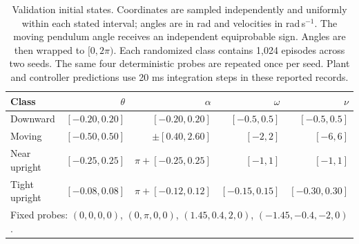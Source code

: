 \documentclass[letterpaper,10pt,conference]{ieeeconf}
\newcommand{\Estar}{E_{\star}}
\begin{document}

\begin{table}[t]
\centering\small
\caption{Validation initial states. Coordinates are sampled independently and uniformly within each stated interval; angles are in rad and velocities in rad\,s$^{-1}$. The moving pendulum angle receives an independent equiprobable sign. Angles are then wrapped to $[0,2\pi)$. Each randomized class contains 1,024 episodes across two seeds. The same four deterministic probes are repeated once per seed. Plant and controller predictions use 20 ms integration steps in these reported records.}
\label{tab:initial}
\begin{tabular}{lrrrr}
\toprule Class & $\theta$ & $\alpha$ & $\omega$ & $\nu$ \\
\midrule Downward & $[-0.20,0.20]$ & $[-0.20,0.20]$ & $[-0.5,0.5]$ & $[-0.5,0.5]$ \\
Moving & $[-0.50,0.50]$ & $\pm[0.40,2.60]$ & $[-2,2]$ & $[-6,6]$ \\
Near upright & $[-0.25,0.25]$ & $\pi+[-0.25,0.25]$ & $[-1,1]$ & $[-1,1]$ \\
Tight upright & $[-0.08,0.08]$ & $\pi+[-0.12,0.12]$ & $[-0.15,0.15]$ & $[-0.30,0.30]$ \\
\midrule
\multicolumn{5}{l}{Fixed probes: $(0,0,0,0)$, $(0,\pi,0,0)$, $(1.45,0.4,2,0)$, $(-1.45,-0.4,-2,0)$.}\\
\bottomrule
\end{tabular}
\end{table}
\end{document}

